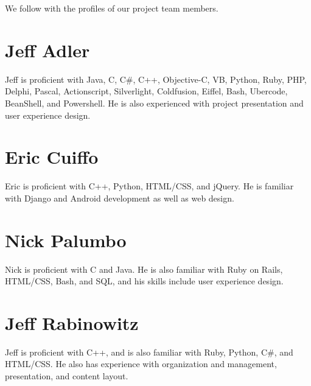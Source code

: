 \documentclass[11pt,letterpaper,oneside]{memoir}
\begin{document}
We follow with the profiles of our project team members.

\section{Jeff Adler}

Jeff is proficient with Java, C, C\#, C++, Objective-C, VB, Python, Ruby,
PHP, Delphi, Pascal, Actionscript, Silverlight, Coldfusion,
Eiffel, Bash, Ubercode, BeanShell, and Powershell. He is also experienced
with project presentation and user experience design.

\section{Eric Cuiffo}

Eric is proficient with C++, Python, HTML/CSS, and jQuery. He is 
familiar with Django and Android development as well as web design.

\section{Nick Palumbo}

Nick is proficient with C and Java. He is also familiar with Ruby on Rails,
HTML/CSS, Bash, and SQL, and his skills include user experience design.

\section{Jeff Rabinowitz}

Jeff is proficient with C++, and is also familiar with Ruby, Python,
C\#, and HTML/CSS. He also has experience with organization and management,
presentation, and content layout.
\end{document}
